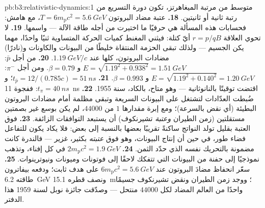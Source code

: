 \begin{solution}{pb:b3:relativistic-dynamics:1}
متوسط من مرتبة الميغاهرتز، تكون دورة التسريع من رتبة
ثانية أو ثانيتين.
\textbf{18.} عتبة مضاد البروتون $T = 6m_{\text{p}}c^2 =
\qty{5.6}{GeV}$، مع هامش: فحسابات هذه المسألة هي حرفيًا ما
اختيرت من أجله طاقة الآلة --- واسمها.
\textbf{19.} لا تحوي العلاقة $r = p/qB$ أيّ كتلة: فيثني المغنط كميات
الحركة المتساوية ثنيًا واحدًا، مهما يكن الجسيم --- ولذلك تبقى الحزمة المنتقاة خليطًا
من البيونات والكاونات و(نادرًا) مضادات البروتون، كلها عند
$\qty{1.19}{GeV}/c$.
\textbf{20.} من أجل $\bar p$: $E = \sqrt{1.19^2 + 0.938^2} =
\qty{1.51}{GeV}$ و $\beta = 0.79$. ومن أجل $\pi^-$: $E = \sqrt{1.19^2 +
0.140^2} = \qty{1.20}{GeV}$ و $\beta = 0.993$.
\textbf{21.} $t_{\bar p} = 12/(0.785c) = \qty{51}{ns}$؛ و $t_\pi =
\qty{40}{ns}$: ففجوة \qty{11}{ns} اقتضت توقيتًا بالنانوثانية ---
وهو متاح، بالكاد، سنة 1955.
\textbf{22.} ضُبطت العدّادات لتشتغل على البيونات السريعة وتبقى
مظلمة أمام مضادات البروتون البطيئة (أي نقض بالسرعة)؛ ومع إبرة
مقدارها $1$ من $44000$، لم يكن بوسع غير بصمتين مستقلتين (زمن الطيران
\emph{وعتبة} تشيرنكوف) أن يستبعد التوافقات الزائفة.
\textbf{23.} فوق العتبة بقليل تولد النواتج ساكنةً تقريبًا
بعضها بالنسبة إلى بعض: فلا يكاد يكون للتفاعل فضاء طور، في حين أن إنتاج
البيونات، وهو فوق \emph{عتبته} بكثير، غزير --- فالندرة كانت
مضمونة بالتحريك نفسه الذي حدّد الثمن.
\textbf{24.} $2m_{\text{p}}c^2 = \qty{1.9}{GeV}$ في كل إفناء،
وتذهب نموذجيًا إلى حفنة من البيونات التي تتفكك لاحقًا إلى فوتونات
وميونات ونيوترينوات.
\textbf{25.} سعّر انحفاظ  مضادَ البروتون عند
$6m_{\text{p}}c^2 = \qty{5.6}{GeV}$ على هدف ثابت؛ ودفعه بيفاترون
طاقته \qty{6.2}{GeV} ونصف قطره \qty{15.1}{m}؛ ووجد زمن الطيران ونقض
تشيرنكوف جسيمًا واحدًا من العالم المضاد لكل $44000$ منتحل
--- وصدّقت جائزة نوبل لسنة 1959 هذا الدفتر.
\end{solution}
